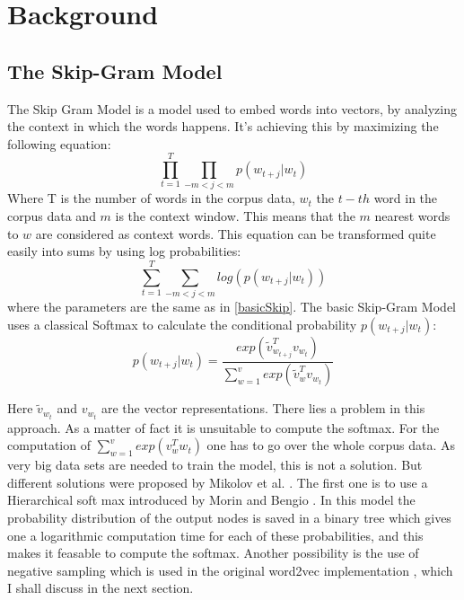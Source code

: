 \chapter{Background}\label{chap:background}

\section{The Skip-Gram Model} 
The Skip Gram Model is a model used to embed words into vectors, by analyzing the context in which the words happens. It's achieving this by maximizing the following equation:\begin{equation} \label{basicSkip} \prod_{t=1}^T \prod_{-m<j<m}  p(w_{t+j}|w_t) \end{equation} Where T is the number of words in the corpus data, $w_t$ the $t-th$ word in the corpus data and $m$ is the context window. This means that the $m$ nearest words to $w$ are considered as context words.
This equation can be transformed quite easily into sums by using log probabilities: 
\begin{equation} \sum _{t=1}^T \sum_{-m<j<m} log( p(w_{t+j}|w_t) )\end{equation} 
    where the parameters are the same as in \ref{basicSkip}. The basic Skip-Gram Model uses a classical Softmax to calculate the conditional probability $p(w_{t+j}|w_t)$: 
   \begin{equation}
   p(w_{t+j}|w_t)=  \frac{exp( \tilde{v}_{w_{t+j}}^Tv_{w_t})}{\sum_{w=1}^v exp(\tilde{v}_w^Tv_{ w_t})}
   \end{equation}
  
  Here $\tilde{v}_{w_t}$ and $ v_{w_t}$ are the vector representations.  There lies a problem in this approach. As a matter of fact it is unsuitable to compute the softmax. For the computation of $\sum_{w=1}^v exp(v_w^T w_t)$ one has to go over the whole corpus data. As very big data sets are needed to train the model, this is not a solution. But different solutions were proposed by Mikolov et al. \cite{mikolov2}. The first one is to use a Hierarchical soft max introduced by Morin and Bengio \cite{hsoftmax}. In this model the probability distribution of the output nodes is saved in a binary tree which gives one a logarithmic computation time for each of these probabilities, and this makes it feasable to compute the softmax. Another possibility is the use of negative sampling which is used in the original word2vec implementation \cite{mikolov2}, which I shall discuss in the next section. 

